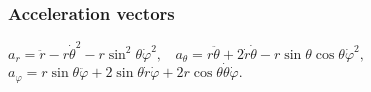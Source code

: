\subsubsection*{Acceleration vectors}
$a_r=\ddot{r}-r\dot{\theta}^2-r\sin^2\theta\dot{\varphi}^2,\ \ \ \ a_\theta=r\ddot{\theta}+2\dot{r}\dot{\theta}-r\sin\theta\cos\theta\dot{\varphi}^2,$\\
$a_\varphi=r\sin\theta\ddot{\varphi}+2\sin\theta\dot{r}\dot{\varphi}+2r\cos{\theta}\dot{\theta}\dot{\varphi}.$


































